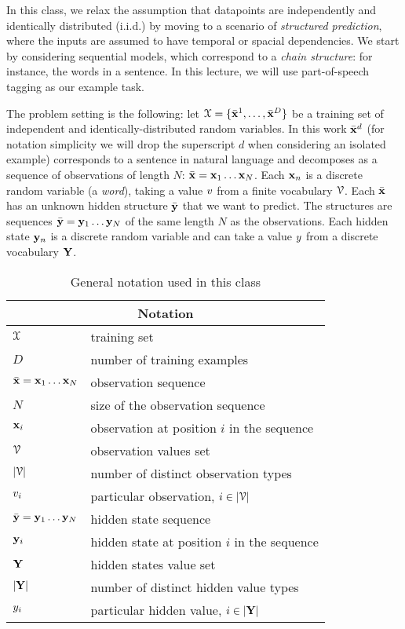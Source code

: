 

In this class, we relax the assumption that
datapoints are independently and identically distributed (i.i.d.) 
by moving to a scenario of \emph{structured prediction}, where the inputs are assumed to have
temporal or spacial dependencies. We start by 
considering sequential models, which correspond to a \emph{chain structure}: for instance,
the words in a sentence. In this lecture, we will use part-of-speech
tagging as our example task.  

The problem setting is the following:
let $\mathcal{X} = \{\bar{\mathbf{x}}^1, \ldots, \bar{\mathbf{x}}^D\}$ be a training set of independent
and identically-distributed random variables. In this work $\bar{\mathbf{x}}^d$
(for notation simplicity we will drop the superscript $d$ when
considering an isolated example) corresponds to a sentence in natural
language and decomposes as a sequence of observations of length $N$: $\bar{\mathbf{x}} = \mathbf{x}_1 \ldots
\mathbf{x}_N$. Each $\mathbf{x}_n$ is a discrete
random variable (a \emph{word}),  taking a value ${v}$ from a
finite vocabulary $\mathcal{V}$. Each $\bar{\mathbf{x}}$ has an unknown hidden
structure $\bar{\mathbf{y}}$  that we want to predict. The
structures are sequences $\bar{\mathbf{y}} = \mathbf{y}_1 \ldots \mathbf{y}_N$ of the same
length $N$ as the observations. Each hidden state $\mathbf{y}_n$ is a discrete
random variable and can take a value ${y}$ from a discrete vocabulary $\mathbf{Y}$. 


\begin{table}[h]
\begin{center}
\begin{tabular}{|l|l|}
\hline
\multicolumn{2}{|c|}{Notation}\\
\hline
\hline
$\mathcal{X}$ & training set \\
\hline
$D$  & number of training examples \\
\hline
$\bar{\mathbf{x}} = \mathbf{x}_1 \ldots \mathbf{x}_N$  & observation sequence \\
\hline
$N  $& size of the observation sequence \\
\hline
$\mathbf{x}_i$ &  observation at position $i$ in the sequence\\
\hline
$\mathcal{V}$ & observation values set\\
\hline 
$|\mathcal{V}|$ & number of distinct observation types\\
\hline 
${v}_i$ & particular observation, $i \in |\mathcal{V}|$\\
\hline 
$\bar{\mathbf{y}} = \mathbf{y}_1 \ldots \mathbf{y}_N$  & hidden state sequence \\
\hline
$\mathbf{y}_i$ &  hidden state at position $i$ in the sequence\\
\hline
$\mathbf{Y}$ & hidden states value set \\
\hline
$|\mathbf{Y}|$ & number of distinct hidden value types \\
\hline
${y}_i$ & particular hidden value, $i \in |\mathbf{Y}|$\\
\hline 
\end{tabular}
\end{center}
\caption{General notation used in this class}
\end{table}

